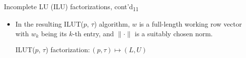 \documentclass[t,usepdftitle=false]{beamer}
\begin{document}
\begin{frame}{Incomplete LU (ILU) factorizations, cont'd\textsubscript{11}}
\begin{itemize}
\item[] In the resulting ILUT($p$, $\tau$) algorithm, $w$ is a full-length working row vector with $w_k$ being its $k$-th entry, and $\|\cdot\|$ is a suitably chosen norm.
\vspace{-.3cm}
\begin{algorithm}[H]
\small
\caption{ILUT($p$, $\tau$) factorization$:(p,\tau)\mapsto (L,U)$}
\begin{algorithmic}[1]\label{algo:ILUT}
\ENDFOR
{}
\ENDFOR
{}
\ENDFOR
\end{algorithmic}
\end{algorithm}
\end{itemize}
\end{frame}
\end{document}
